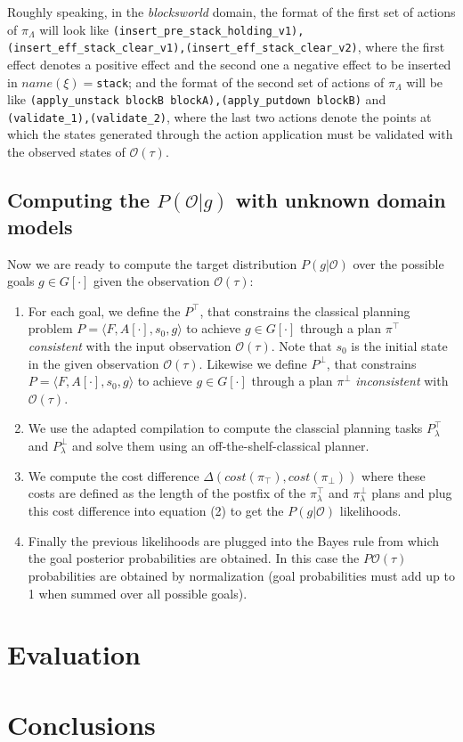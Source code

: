 \documentclass{article}
\newcommand{\tup}[1]{{\langle #1 \rangle}}
\begin{document}
Roughly speaking, in the \emph{blocksworld} domain, the format of the first set of actions of $\pi_\Lambda$ will look like {\tt{\small (insert\_pre\_stack\_holding\_v1),(insert\_eff\_stack\_clear\_v1),(insert\_eff\_stack\_clear\_v2)}}, where the first effect denotes a positive effect and the second one a negative effect to be inserted in $name(\xi)=${\tt{\small stack}}; and the format of the second set of actions of $\pi_\Lambda$ will be like {\tt{\small (apply\_unstack blockB blockA),(apply\_putdown blockB)}} and {\tt{\small (validate\_1),(validate\_2)}}, where the last two actions denote the points at which the states generated through the action application must be validated with the observed states of $\mathcal{O}(\tau)$.


\subsection{Computing the $P(\mathcal{O}|g)$ with unknown domain models}
Now we are ready to compute the target distribution $P(g|\mathcal{O})$ over the possible goals $g\in G[\cdot]$ given the observation $\mathcal{O}(\tau)$:
\begin{enumerate}
\item For each goal, we define the $P^{\top}$, that constrains the classical planning problem $P=\tup{F,A[\cdot],s_0,g}$ to achieve $g\in G[\cdot]$ through a plan $\pi^\top$ {\em consistent} with the input observation $\mathcal{O}(\tau)$. Note that $s_0$ is the initial state in the given observation $\mathcal{O}(\tau)$. Likewise we define $P^{\bot}$, that constrains $P=\tup{F,A[\cdot],s_0,g}$ to achieve $g\in G[\cdot]$ through a plan $\pi^\bot$ {\em inconsistent} with $\mathcal{O}(\tau)$.
\item We use the adapted compilation to compute the classcial planning tasks $P^{\top}_\lambda$ and $P^{\bot}_\lambda$ and solve them using an off-the-shelf-classical planner.
\item We compute the cost difference $\Delta(cost(\pi_\top),cost(\pi_\bot))$ where these costs are defined as the length of the postfix of the $\pi^{\top}_\lambda$ and $\pi^{\bot}_\lambda$ plans and plug this cost difference into equation (2) to get the $P(g|\mathcal{O})$ likelihoods.
\item Finally the previous likelihoods are plugged into the Bayes rule from which the goal posterior probabilities are obtained. In this case the $P\mathcal{O}(\tau)$ probabilities are obtained by normalization (goal probabilities must add up to 1 when summed over all possible goals).
\end{enumerate}


\section{Evaluation}
\label{sec:evaluation}



\section{Conclusions}
\label{sec:conclusions}




\end{document}
